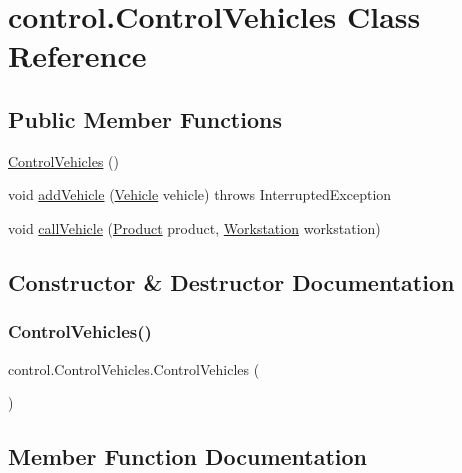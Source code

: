 \hypertarget{classcontrol_1_1_control_vehicles}{}\section{control.\+Control\+Vehicles Class Reference}
\label{classcontrol_1_1_control_vehicles}
\subsection*{Public Member Functions}
\begin{DoxyCompactItemize}
\item 
\mbox{\hyperlink{classcontrol_1_1_control_vehicles_afd46888d87244de6803db2a687546e23}{Control\+Vehicles}} ()
\item 
void \mbox{\hyperlink{classcontrol_1_1_control_vehicles_aa17b181b16db7ce714f1970b623b91f3}{add\+Vehicle}} (\mbox{\hyperlink{classclases_1_1_vehicle}{Vehicle}} vehicle)  throws Interrupted\+Exception 
\item 
void \mbox{\hyperlink{classcontrol_1_1_control_vehicles_ad7d1c177cdb8f933c3cb80adb7c56672}{call\+Vehicle}} (\mbox{\hyperlink{classclases_1_1_product}{Product}} product, \mbox{\hyperlink{classclases_1_1_workstation}{Workstation}} workstation)
\end{DoxyCompactItemize}


\subsection{Constructor \& Destructor Documentation}
\mbox{\label{classcontrol_1_1_control_vehicles_afd46888d87244de6803db2a687546e23}} 
\subsubsection{\texorpdfstring{Control\+Vehicles()}{ControlVehicles()}}
{\footnotesize\ttfamily control.\+Control\+Vehicles.\+Control\+Vehicles (\begin{DoxyParamCaption}{ }\end{DoxyParamCaption})}



\subsection{Member Function Documentation}
\mbox{\label{classcontrol_1_1_control_vehicles_aa17b181b16db7ce714f1970b623b91f3}} 
